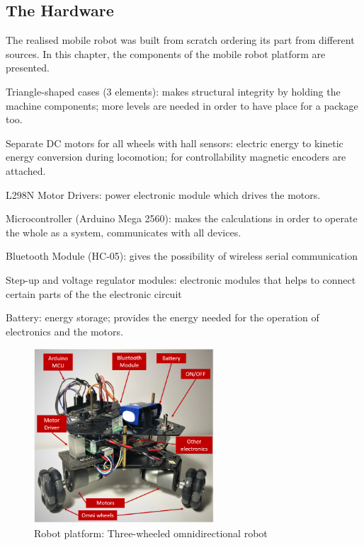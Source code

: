 \documentclass[12pt,english,twoside]{article}
\begin{document}
\subsection{The Hardware}
The realised mobile robot was built from scratch ordering its part from different sources. In this chapter, the components of the mobile robot platform are presented.
\begin{itemize}
{\small 	\item Triangle-shaped cases (3 elements): makes structural integrity by holding the machine components; more levels are needed in order to have place for a package too.
	\item Separate DC motors for all wheels with hall sensors: electric energy to kinetic energy conversion during locomotion; for controllability magnetic encoders are attached.
	\item L298N Motor Drivers: power electronic module which drives the motors.
	\item Microcontroller (Arduino Mega 2560): makes the calculations in order to operate the whole as a system, communicates with all devices.
	\item Bluetooth Module (HC-05): gives the possibility of wireless serial communication
	\item Step-up and voltage regulator modules: electronic modules that helps to connect certain parts of the the electronic circuit
	\item Battery: energy storage; provides the energy needed for the operation of electronics and the motors.}
\end{itemize}
\begin{figure}[htb!]
	\centering
	\includegraphics[width=0.6\textwidth]{figures/robot_platform_1.png}
	\caption{Robot platform: Three-wheeled omnidirectional robot}
	\label{robot_platform_1}
\end{figure}
\newpage
\end{document}
